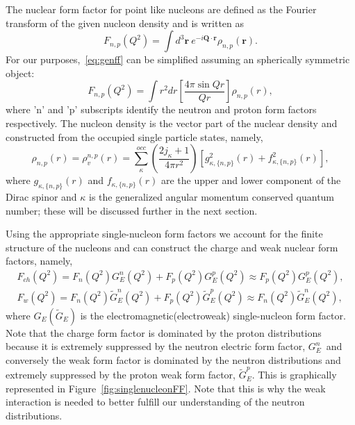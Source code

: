 The nuclear form factor for point like nucleons are defined as the Fourier transform of the given nucleon density and is written as
\begin{equation}\label{eq:genff}
F_{n,p}(Q^2)=\int d^3\mathbf{r}\ e^{-i\mathbf{Q\cdot r}}\rho_{n,p}(\mathbf{r}).
\end{equation}
For our purposes,~\eqref{eq:genff} can be simplified assuming an spherically symmetric object: 
\begin{equation}\label{eq:pointnuclearff}
F_{n,p}(Q^2)=\int r^2 dr\left[ \frac{4\pi \sin Qr}{Qr}\right] \rho_{n,p}(r),
\end{equation}
where 'n' and 'p' subscripts identify the neutron and proton form factors respectively. The nucleon density is the vector part of the nuclear density and constructed from the occupied single particle states, namely,
\begin{equation}
\rho _{n,p}(r)=\rho^{n,p} _{v}(r) = \sum^{occ}_{\kappa} \left( \frac{2j_{\kappa} + 1}{4\pi r^2} \right) [g_{\kappa,\lbrace n,p\rbrace}^2(r)+f_{\kappa,\lbrace n,p\rbrace}^2(r)],
\end{equation}
where $g_{\kappa,\lbrace n,p\rbrace}(r)$ and $f_{\kappa,\lbrace n,p\rbrace}(r)$ are the upper and lower component of the Dirac spinor and $\kappa$ is the generalized angular momentum conserved quantum number; these will be discussed further in the next section.

Using the appropriate single-nucleon form factors we account for the finite structure of the nucleons and can construct the charge and weak nuclear form factors, namely,
\begin{gather}
F_{ch}(Q^2) = F_n(Q^2)G_E^n(Q^2) + F_p(Q^2)G_E^p(Q^2) \approx F_p(Q^2)G_E^p(Q^2), 
\\
F_{w}(Q^2) = F_n(Q^2)\widetilde{G}_E^n(Q^2) + F_p(Q^2)\widetilde{G}_E^p(Q^2) \approx F_n(Q^2)\widetilde{G}_E^n(Q^2),
\end{gather}
where $G_E(\widetilde{G}_E)$ is the electromagnetic(electroweak) single-nucleon form factor. Note that the charge form factor is dominated by the proton distributions because it is extremely suppressed by the neutron electric form factor, $G_E^n$\ and conversely the weak form factor is dominated by the neutron distributions and extremely suppressed by the proton weak form factor, $\widetilde{G}_E^p$. This is graphically represented in Figure~\ref{fig:singlenucleonFF}. Note that this is why the weak interaction is needed to better fulfill our understanding of the neutron distributions.

